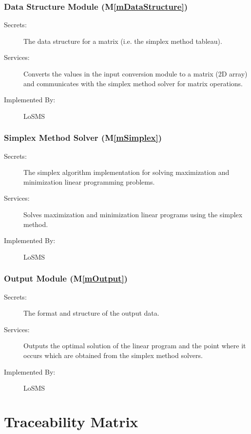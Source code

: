 \documentclass[12pt, titlepage]{article}
\newcommand{\mref}[1]{M\ref{#1}}
\newcommand{\famname}{LoSMS} %
\begin{document}
\subsubsection{Data Structure Module (\mref{mDataStructure})}

\begin{description}
	\item[Secrets:]The data structure for a matrix (i.e. the simplex method 
	tableau).
	\item[Services:]Converts the values in the input conversion module to a 
	matrix (2D array) and communicates with the simplex method solver for 
	matrix operations.
	\item[Implemented By:] \famname{}
\end{description}

\subsubsection{Simplex Method Solver (\mref{mSimplex})}

\begin{description}
	\item[Secrets:]The simplex algorithm implementation for solving 
	maximization and minimization linear programming problems.
	\item[Services:]Solves maximization and minimization linear programs using 
	the simplex method.
	\item[Implemented By:] \famname{}
\end{description}

\subsubsection{Output Module (\mref{mOutput})}

\begin{description}
	\item[Secrets:]The format and structure of the output data.
	\item[Services:]Outputs the optimal solution of the linear program and the 
	point where it occurs which are obtained from the simplex method solvers.
	\item[Implemented By:] \famname{}
\end{description}

\section{Traceability Matrix} \label{SecTM}
\end{document}
